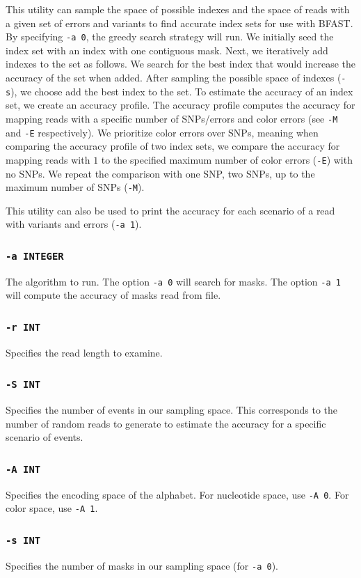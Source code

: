 \documentclass[a4paper,12pt]{book}
\newcommand{\TT}[1]{{\tt #1}} %
\begin{document}
This utility can sample the space of possible indexes and the space of reads with a given set of errors and variants to find accurate index sets for use with BFAST.
By specifying \TT{-a 0}, the greedy search strategy will run.
We initially seed the index set with an index with one contiguous mask.
Next, we iteratively add indexes to the set as follows.
We search for the best index that would increase the accuracy of the set when added.
After sampling the possible space of indexes (\TT{-s}), we choose add the best index to the set.
To estimate the accuracy of an index set, we create an accuracy profile.
The accuracy profile computes the accuracy for mapping reads with a specific number of SNPs/errors and color errors (see \TT{-M} and \TT{-E} respectively).
We prioritize color errors over SNPs, meaning when comparing the accuracy profile of two index sets, we compare the accuracy for mapping reads with $1$ to the specified maximum number of color errors (\TT{-E}) with no SNPs.
We repeat the comparison with one SNP, two SNPs, up to the maximum number of SNPs (\TT{-M}).

This utility can also be used to print the accuracy for each scenario of a read with variants and errors (\TT{-a 1}). 

\subsubsection{\TT{-a INTEGER}}
The algorithm to run.
The option \TT{-a 0} will search for masks.
The option \TT{-a 1} will compute the accuracy of masks read from file.
\subsubsection{\TT{-r INT}}
Specifies the read length to examine.
\subsubsection{\TT{-S INT}}
Specifies the number of events in our sampling space.
This corresponds to the number of random reads to generate to estimate the accuracy for a specific scenario of events.
\subsubsection{\TT{-A INT}}
Specifies the encoding space of the alphabet.
For nucleotide space, use \TT{-A 0}.
For color space, use \TT{-A 1}.
\subsubsection{\TT{-s INT}}
Specifies the number of masks in our sampling space (for \TT{-a 0}).
\end{document}
